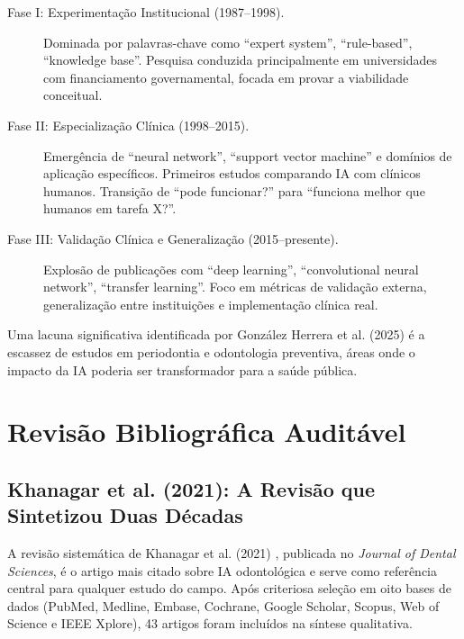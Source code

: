 \begin{description}
    \item[Fase I: Experimentação Institucional (1987--1998).] Dominada por palavras-chave como ``expert system'', ``rule-based'', ``knowledge base''. Pesquisa conduzida principalmente em universidades com financiamento governamental, focada em provar a viabilidade conceitual.
    \item[Fase II: Especialização Clínica (1998--2015).] Emergência de ``neural network'', ``support vector machine'' e domínios de aplicação específicos. Primeiros estudos comparando IA com clínicos humanos. Transição de ``pode funcionar?'' para ``funciona melhor que humanos em tarefa X?''.
    \item[Fase III: Validação Clínica e Generalização (2015--presente).] Explosão de publicações com ``deep learning'', ``convolutional neural network'', ``transfer learning''. Foco em métricas de validação externa, generalização entre instituições e implementação clínica real.
\end{description}

Uma lacuna significativa identificada por González Herrera et al. (2025) é a escassez de estudos em periodontia e odontologia preventiva, áreas onde o impacto da IA poderia ser transformador para a saúde pública.

\section{Revisão Bibliográfica Auditável}

\subsection{Khanagar et al. (2021): A Revisão que Sintetizou Duas Décadas}

A revisão sistemática de Khanagar et al. (2021) \cite{ODT-001}, publicada no \textit{Journal of Dental Sciences}, é o artigo mais citado sobre IA odontológica e serve como referência central para qualquer estudo do campo. Após criteriosa seleção em oito bases de dados (PubMed, Medline, Embase, Cochrane, Google Scholar, Scopus, Web of Science e IEEE Xplore), 43 artigos foram incluídos na síntese qualitativa.


